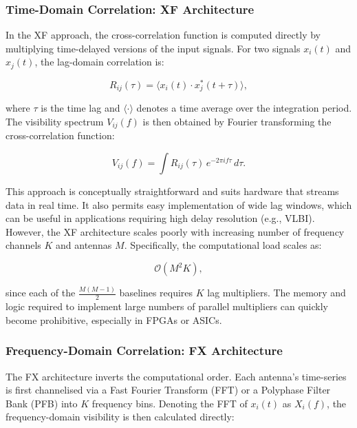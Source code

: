         \subsubsection*{Time-Domain Correlation: XF Architecture}
        In the XF approach, the cross-correlation function is computed directly by multiplying time-delayed versions of the input signals. For two signals \( x_i(t) \) and \( x_j(t) \), the lag-domain correlation is:

        \begin{equation}
            R_{ij}(\tau) = \langle x_i(t) \cdot x_j^*(t + \tau) \rangle,
        \end{equation}

        where \( \tau \) is the time lag and \( \langle \cdot \rangle \) denotes a time average over the integration period. The visibility spectrum \( V_{ij}(f) \) is then obtained by Fourier transforming the cross-correlation function:

        \begin{equation}
            V_{ij}(f) = \int R_{ij}(\tau) \, e^{-2\pi i f \tau} \, d\tau.
        \end{equation}

        This approach is conceptually straightforward and suits hardware that streams data in real time. It also permits easy implementation of wide lag windows, which can be useful in applications requiring high delay resolution (e.g., VLBI). However, the XF architecture scales poorly with increasing number of frequency channels \( K \) and antennas \( M \). Specifically, the computational load scales as:

        \begin{equation}
            \mathcal{O}\left(M^2 K\right),
        \end{equation}

        since each of the \( \frac{M(M-1)}{2} \) baselines requires \( K \) lag multipliers. The memory and logic required to implement large numbers of parallel multipliers can quickly become prohibitive, especially in FPGAs or ASICs.

        \subsubsection*{Frequency-Domain Correlation: FX Architecture}
        The FX architecture inverts the computational order. Each antenna’s time-series is first channelised via a Fast Fourier Transform (FFT) or a Polyphase Filter Bank (PFB) into \( K \) frequency bins. Denoting the FFT of \( x_i(t) \) as \( X_i(f) \), the frequency-domain visibility is then calculated directly:

